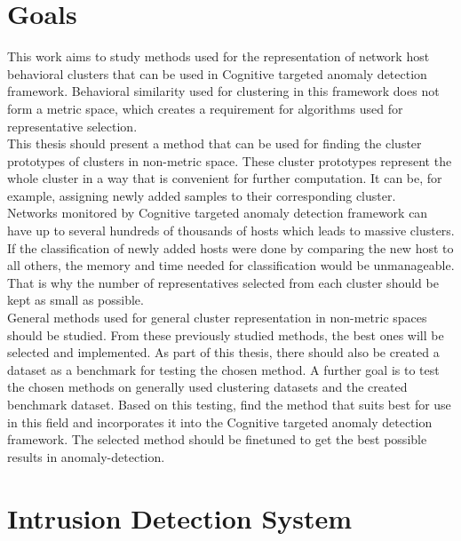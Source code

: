 \documentclass[thesis=B,english]{FITthesis}[2012/10/20]
\begin{document}
\chapter{Goals}

This work aims to study methods used for the representation of network host behavioral clusters that can be used in Cognitive targeted anomaly detection framework.
Behavioral similarity used for clustering in this framework does not form a metric space, which creates a requirement for algorithms used for representative selection. \\

This thesis should present a method that can be used for finding the cluster prototypes of clusters in non-metric space.
These cluster prototypes represent the whole cluster in a way that is convenient for further computation.
It can be, for example, assigning newly added samples to their corresponding cluster.\\

Networks monitored by Cognitive targeted anomaly detection framework can have up to several hundreds of thousands of hosts which leads to massive clusters.
If the classification of newly added hosts were done by comparing the new host to all others, the memory and time needed for classification would be unmanageable.
That is why the number of representatives selected from each cluster should be kept as small as possible. \\

General methods used for general cluster representation in non-metric spaces should be studied.
From these previously studied methods, the best ones will be selected and implemented.
As part of this thesis, there should also be created a dataset as a benchmark for testing the chosen method.
A further goal is to test the chosen methods on generally used clustering datasets and the created benchmark dataset.
Based on this testing, find the method that suits best for use in this field and incorporates it into the Cognitive targeted anomaly detection framework.
The selected method should be finetuned to get the best possible results in anomaly-detection.



\chapter{Intrusion Detection System}
\end{document}
